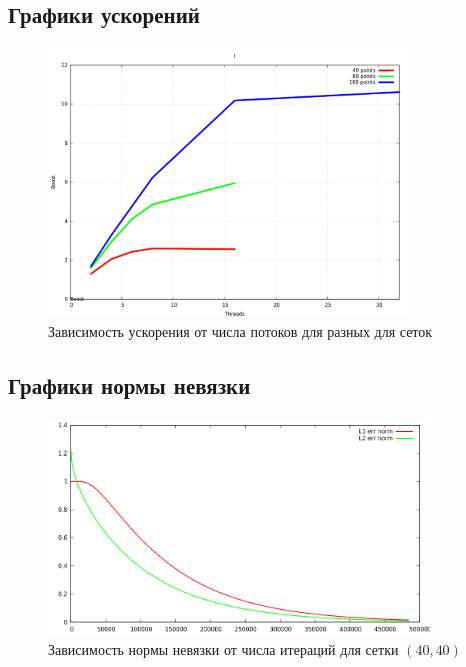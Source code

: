 \documentclass[oneside,final,14pt]{extreport}
\begin{document}
\newpage
\subsection{Графики ускорений}
\begin{figure}[h!]
  \centering
  \includegraphics[width=0.85\textwidth]{picture5}
  \caption{Зависимость ускорения от числа потоков для разных для сеток}
\end{figure}

\newpage
\subsection{Графики нормы невязки}
\begin{figure}[ht!]
  \centering
  \includegraphics[width=0.9\textwidth]{picture6}
  \caption{Зависимость нормы невязки от числа итераций для сетки \((40, 40)\)}
\end{figure}
\end{document}
